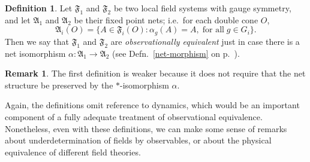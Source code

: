\documentclass[11pt]{article}
\newcommand{\alg}[1]{\mathfrak{#1}}
\theoremstyle{definition}
\theoremstyle{definition}
\newtheorem{defn}[thm]{Definition}
\newtheorem{rema}[thm]{Remark}
\theoremstyle{remark}
\def\al#1{{\mathfrak #1}}
\def\a{\alpha} \def\b{\beta} \def\g{\gamma} \def\d{\delta}
\begin{document}
\begin{defn}
  Let $\al F_1$ and $\al F_2$ be two local field systems with gauge
  symmetry, and let $\al A_1$ and $\al A_2$ be their fixed point nets;
  i.e.\ for each double cone $O$,
$$ \al A_i(O) =\{ A\in \al F_i(O):\a _g(A)=A,\; \mbox{for all}\; g\in
G_i \} .$$ Then we say that $\alg{F}_1$ and $\alg{F}_2$ are
\emph{observationally equivalent} just in case there is a net
isomorphism $\a :\al A_1\to \al A_2$ (see Defn.\ \ref{net-morphism} on
p.\ \pageref{net-morphism}).
\end{defn}

\begin{rema} The first definition is weaker because it does not
  require that the net structure be preserved by the $*$-isomorphism
  $\a$.  \end{rema}

Again, the definitions omit reference to dynamics, which would be an
important component of a fully adequate treatment of observational
equivalence.  Nonetheless, even with these definitions, we can make
some sense of remarks about underdetermination of fields by
observables, or about the physical equivalence of different field
theories.
\end{document}
